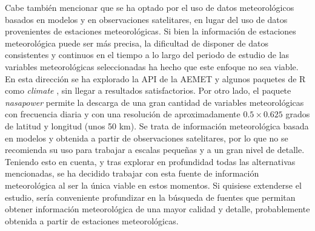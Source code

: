 \documentclass[12pt,a4paper,]{book}
\numberwithin{dummy}{section}
\theoremstyle{ocrenumbox}
\theoremstyle{blacknumex}
\theoremstyle{blacknumbox}
\theoremstyle{ocrenum}
\theoremstyle{ocrenum}
\begin{document}
Cabe también mencionar que se ha optado por el uso de datos
meteorológicos basados en modelos y en observaciones satelitares, en
lugar del uso de datos provenientes de estaciones meteorológicas. Si
bien la información de estaciones meteorológica puede ser más precisa,
la dificultad de disponer de datos consistentes y continuos en el tiempo
a lo largo del periodo de estudio de las variables meteorológicas
seleccionadas ha hecho que este enfoque no sea viable. En esta dirección
se ha explorado la API de la AEMET y algunos paquetes de R como
\emph{climate} \citep{climate}, sin llegar a resultados satisfactorios.
Por otro lado, el paquete \emph{nasapower} \citep{nasapower} permite la
descarga de una gran cantidad de variables meteorológicas con frecuencia
diaria y con una resolución de aproximadamente \(0.5 \times 0.625\)
grados de latitud y longitud (unos 50 km). Se trata de información
meteorológica basada en modelos y obtenida a partir de observaciones
satelitares, por lo que no se recomienda su uso para trabajar a escalas
pequeñas y a un gran nivel de detalle. Teniendo esto en cuenta, y tras
explorar en profundidad todas las alternativas mencionadas, se ha
decidido trabajar con esta fuente de información meteorológica al ser la
única viable en estos momentos. Si quisiese extenderse el estudio, sería
conveniente profundizar en la búsqueda de fuentes que permitan obtener
información meteorológica de una mayor calidad y detalle, probablemente
obtenida a partir de estaciones meteorológicas.
\end{document}
